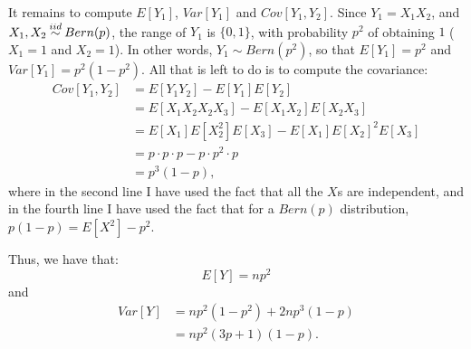 \begin{problem}{4}
It remains to compute $E[Y_1]$, $Var[Y_1]$ and $Cov[Y_1, Y_2]$.  Since $Y_1 = X_1X_2$, and $X_1, X_2 \distas{iid} Bern(p)$, the range of $Y_1$ is $\{0, 1 \}$, with probability $p^2$ of obtaining $1$ ($X_1 =1$ and $X_2 = 1$).  In other words, $Y_1\sim Bern(p^2)$, so that $E[Y_1] = p^2$ and $Var[Y_1] = p^2 (1-p^2)$.  All that is left to do is to compute the covariance:
\begin{align*}
Cov[Y_1, Y_2] &= E[Y_1Y_2]-E[Y_1]E[Y_2] \\
&= E[X_1X_2 X_2X_3]-E[X_1X_2]E[X_2X_3] \\
& = E[X_1]E[X_2^2]E[X_3]-E[X_1]E[X_2]^2E[X_3] \\
& = p\cdot p \cdot p - p\cdot p^2 \cdot p \\
& = p^3(1-p),
\end{align*}
where in the second line I have used the fact that all the $X$s are independent, and in the fourth line I have used the fact that for a $Bern(p)$ distribution, $p(1-p) = E[X^2] - p^2$. 

Thus, we have that:
\begin{equation*}
E[Y]  = np^2
\end{equation*}
and
\begin{align*}
Var[Y] &= np^2(1-p^2)+2np^3(1-p) \\
& = np^2 (3p+1)(1-p).
\end{align*}

\end{problem}

